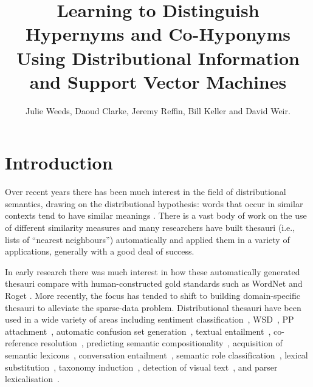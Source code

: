\documentclass[11pt]{article}
\title{Learning to Distinguish Hypernyms and Co-Hyponyms Using Distributional Information and Support Vector Machines}
\author{Julie Weeds, Daoud Clarke, Jeremy Reffin, Bill Keller and David Weir.}
\date{} %
\begin{document}
\maketitle

\begin{abstract}
\end{abstract}
\section{Introduction}

Over recent years there has been much interest in the field of distributional semantics, drawing on the distributional hypothesis: words that occur in similar contexts tend to have similar meanings \cite{Harris1954}.   There is a vast body of work on the use of different similarity measures \cite{Lee1999,Weeds2003,Curran2004} and many researchers have built thesauri (i.e., lists of ``nearest neighbours'') automatically and applied them in a variety of applications, generally with a good deal of success.

In early research there was much interest in how these automatically generated thesauri compare with human-constructed gold standards such as WordNet and Roget \cite{Lin1998,Kilgarriff2000}.  More recently, the focus has tended to shift to building domain-specific thesauri to alleviate the sparse-data problem.  Distributional thesauri have been used in a wide variety of areas including sentiment classification~\cite{Bollegala2011}, WSD~\cite{miller-EtAl:2012:PAPERS,khapra-EtAl:2010:ACL}, PP attachment~\cite{Calvo05distributionalthesaurus}, automatic confusion set generation~\cite{xue-hwa:2012:PAPERS}, textual entailment~\cite{berant-dagan-goldberger:2010:ACL}, co-reference resolution~\cite{lee-EtAl:2012:EMNLP-CoNLL}, predicting semantic compositionality~\cite{bergsma-EtAl:2010:EMNLP}, acquisition of semantic lexicons~\cite{mcintosh:2010:EMNLP}, conversation entailment~\cite{zhang-chai:2010:EMNLP}, semantic role classification~\cite{zapirain-EtAl:2010:NAACLHLT}, lexical substitution~\cite{szarvas-biemann-gurevych:2013:NAACL-HLT}, taxonomy induction~\cite{fountain-lapata:2012:NAACL-HLT}, detection of visual text~\cite{dodge-EtAl:2012:NAACL-HLT}, and parser lexicalisation~\cite{rei-briscoe:2013:NAACL-HLT}.  
\end{document}
